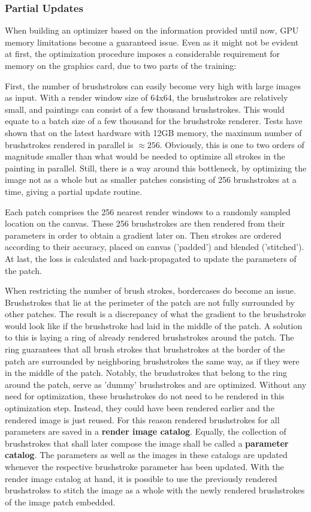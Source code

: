 \subsubsection{Partial Updates}

When building an optimizer based on the information provided until now, GPU memory limitations become a guaranteed issue.
Even as it might not be evident at first, the optimization procedure imposes a considerable requirement for memory on the graphics card, due to two parts of the training:

First, the number of brushstrokes can easily become very high with large images as input.
With a render window size of 64x64, the brushstrokes are relatively small, and paintings can consist of a few thousand brushstrokes.
This would equate to a batch size of a few thousand for the brushstroke renderer.
Tests have shown that on the latest hardware with 12GB memory, the maximum number of brushstrokes rendered in parallel is $\approx 256$.
Obviously, this is one to two orders of magnitude smaller than what would be needed to optimize all strokes in the painting in parallel.
Still, there is a way around this bottleneck, by optimizing the image not as a whole but as smaller patches consisting of 256 brushstrokes at a time, giving a partial update routine.

Each patch comprises the 256 nearest render windows to a randomly sampled location on the canvas.
These 256 brushstrokes are then rendered from their parameters in order to obtain a gradient later on.
Then strokes are ordered according to their accuracy, placed on canvas ('padded') and blended ('stitched').
At last, the loss is calculated and back-propagated to update the parameters of the patch.

When restricting the number of brush strokes, bordercases do become an issue.
Brushstrokes that lie at the perimeter of the patch are not fully surrounded by other patches.
The result is a discrepancy of what the gradient to the brushstroke would look like if the brushstroke had laid in the middle of the patch.
A solution to this is laying a ring of already rendered brushstrokes around the patch.
The ring guarantees that all brush strokes that brushstrokes at the border of the patch are surrounded by neighboring brushstrokes the same way, as if they were in the middle of the patch.
Notably, the brushstrokes that belong to the ring around the patch, serve as 'dummy' brushstrokes and are optimized.
Without any need for optimization, these brushstrokes do not need to be rendered in this optimization step.
Instead, they could have been rendered earlier and the rendered image is just reused.
For this reason rendered brushstrokes for all parameters are saved in a \textbf{render image catalog}.
Equally, the collection of brushstrokes that shall later compose the image shall be called a \textbf{parameter catalog}.
The parameters as well as the images in these catalogs are updated whenever the respective brushstroke parameter has been updated.
With the render image catalog at hand, it is possible to use the previously rendered brushstrokes to stitch the image as a whole with the newly rendered brushstrokes of the image patch embedded.

